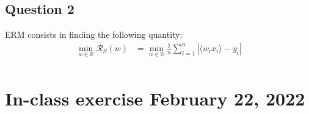\documentclass{article}
\newcommand{\1}{\mathbf{1}}
\newcommand{\R}{\mathbb{R}}
\begin{document}
\subsection{Question 2}
ERM consists in finding the following quantity:
\begin{align*}
  \min_{w \in \R} \mathcal{R}_S (w)
   & = \min_{w \in \R} \frac{1}{n} \sum_{i=1}^n |\langle w_i x_i \rangle - y_i| \\
\end{align*}





\section{In-class exercise February 22, 2022}
\end{document}
